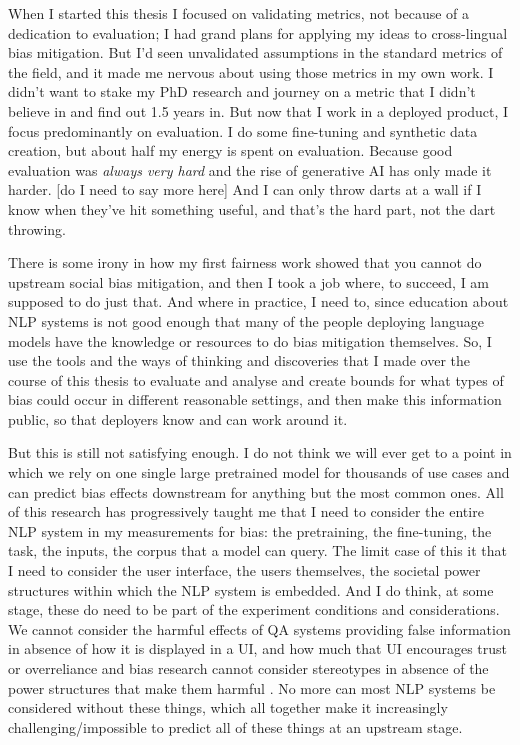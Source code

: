 When I started this thesis I focused on validating metrics, not because of a dedication to evaluation; I had grand plans for applying my ideas to cross-lingual bias mitigation. But I'd seen unvalidated assumptions in the standard metrics of the field, and it made me nervous about using those metrics in my own work. I didn't want to stake my PhD research and journey on a metric that I didn't believe in and find out 1.5 years in. But now that I work in a deployed product, I focus predominantly on evaluation. I do some fine-tuning and synthetic data creation, but about half my energy is spent on evaluation. Because good evaluation was \textit{always very hard} and the rise of generative AI has only made it harder. [do I need to say more here] And I can only throw darts at a wall if I know when they've hit something useful, and that's the hard part, not the dart throwing. 

There is some irony in how my first fairness work showed that you cannot do upstream social bias mitigation, and then I took a job where, to succeed, I am supposed to do just that. And where in practice, I need to, since education about NLP systems is not good enough that many of the people deploying language models have the knowledge or resources to do bias mitigation themselves. So, I use the tools and the ways of thinking and discoveries that I made over the course of this thesis to evaluate and analyse and create bounds for what types of bias could occur in different reasonable settings, and then make this information public, so that deployers know and can work around it. 

But this is still not satisfying enough. I do not think we will ever get to a point in which we rely on one single large pretrained model for thousands of use cases and can predict bias effects downstream for anything but the most common ones. All of this research has progressively taught me that I need to consider the entire NLP system in my measurements for bias: the pretraining, the fine-tuning, the task, the inputs, the corpus that a model can query. The limit case of this it that I need to consider the user interface, the users themselves, the societal power structures within which the NLP system is embedded. And I do think, at some stage, these do need to be part of the experiment conditions and considerations. We cannot consider the harmful effects of QA systems providing false information in absence of how it is displayed in a UI, and how much that UI encourages trust or overreliance \citep{} and bias research cannot consider stereotypes in absence of the power structures that make them harmful \citep{blodgett-etal-2021-stereotyping}. No more can most NLP systems be considered without these things, which all together make it increasingly challenging/impossible to predict all of these things at an upstream stage. 

